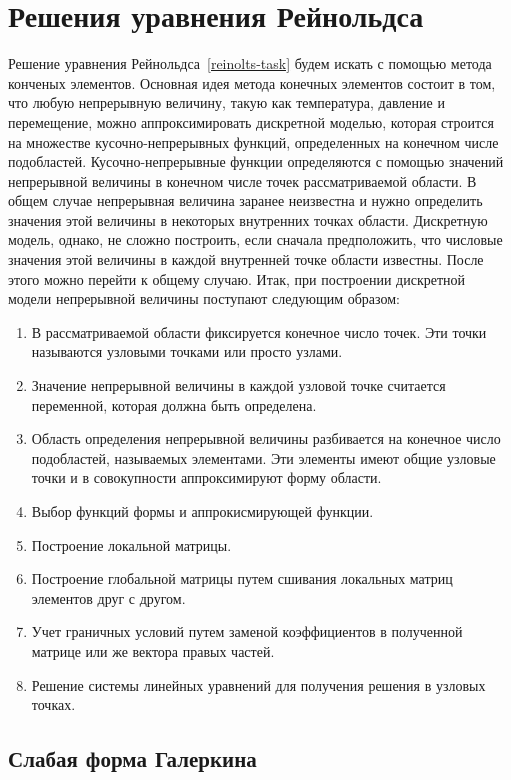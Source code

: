 \documentclass[a4paper,14pt]{extarticle}
\begin{document}
\section{Решения уравнения Рейнольдса}

Решение уравнения Рейнольдса~\eqref{reinolts-task} будем искать с помощью метода конченых элементов.
Основная идея метода конечных элементов состоит в том, что любую непрерывную величину, такую как температура, давление и перемещение, можно аппроксимировать дискретной моделью, которая строится на множестве кусочно-непрерывных функций, определенных на конечном числе подобластей. Кусочно-непрерывные функции определяются с помощью значений непрерывной величины в конечном числе точек рассматриваемой области.
В общем случае непрерывная величина заранее неизвестна и нужно определить значения этой величины в некоторых внутренних точках области. Дискретную модель, однако, не сложно построить, если сначала предположить, что числовые значения этой величины в каждой внутренней точке области известны. После этого можно перейти к общему случаю. Итак, при построении дискретной модели непрерывной величины поступают следующим образом:
\begin{enumerate}
	\item В рассматриваемой области фиксируется конечное число точек. Эти точки называются узловыми точками или просто узлами.
	\item Значение непрерывной величины в каждой узловой точке считается переменной, которая должна быть определена.
	\item Область определения непрерывной величины разбивается на конечное число подобластей, называемых элементами. Эти элементы имеют общие узловые точки и в совокупности аппроксимируют форму области.
	\item Выбор функций формы и аппрокисмирующей функции.
	\item Построение локальной матрицы.
	\item Построение глобальной матрицы путем сшивания локальных матриц элементов друг с другом.
	\item Учет граничных условий путем заменой коэффициентов в полученной матрице или же вектора правых частей.
	\item Решение системы линейных уравнений для получения решения в узловых точках.
\end{enumerate}

\subsection{Слабая форма Галеркина}
\end{document}
